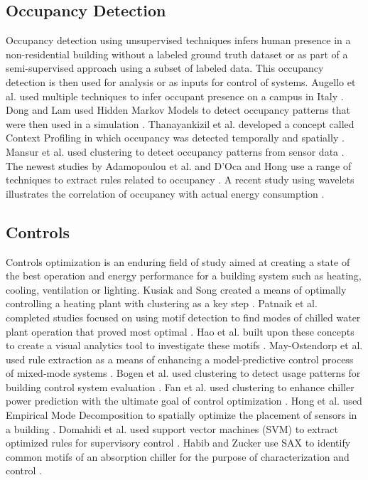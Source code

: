 \documentclass[preprint,12pt,3p]{elsarticle}
\begin{document}
\subsection{Occupancy Detection}
Occupancy detection using unsupervised techniques infers human presence in a non-residential building without a labeled ground truth dataset or as part of a semi-supervised approach using a subset of labeled data. This occupancy detection is then used for analysis or as inputs for control of systems. Augello et al. used multiple techniques to infer occupant presence on a campus in Italy \cite{augello_sensor_2011}. Dong and Lam  used Hidden Markov Models to detect occupancy patterns that were then used in a simulation \cite{dong_building_2011}. Thanayankizil et al. developed a concept called Context Profiling in which occupancy was detected temporally and spatially \cite{thanayankizil_softgreen:_2012}. Mansur et al. used clustering to detect occupancy patterns from sensor data \cite{mansur_learning_2015}. The newest studies by Adamopoulou et al. and D'Oca and Hong use a range of techniques to extract rules related to occupancy \cite{adamopoulou_context-aware_2015,doca_occupancy_2015}. A recent study using wavelets illustrates the correlation of occupancy with actual energy consumption \cite{ahn_correlation_2016}.

\subsection{Controls}
Controls optimization is an enduring field of study aimed at creating a state of the best operation and energy performance for a building system such as heating, cooling, ventilation or lighting. Kusiak and Song created a means of optimally controlling a heating plant with clustering as a key step \cite{kusiak_clustering-based_2008}. Patnaik et al. completed studies focused on using motif detection to find modes of chilled water plant operation that proved most optimal \cite{patnaik_data_2010,patnaik_sustainable_2009}. Hao et al. built upon these concepts to create a visual analytics tool to investigate these motifs \cite{hao_visualizing_2011}. May-Ostendorp et al. used rule extraction as a means of enhancing a model-predictive control process of mixed-mode systems \cite{may-ostendorp_model-predictive_2011,may-ostendorp_extraction_2013}. Bogen et al. used clustering to detect usage patterns for building control system evaluation \cite{bogen_evaluating_2013}. Fan et al. used clustering to enhance chiller power prediction with the ultimate goal of control optimization \cite{fan_prediction_2013}. Hong et al. used Empirical Mode Decomposition to spatially optimize the placement of sensors in a building \cite{hong_towards_2013}. Domahidi et al. used support vector machines (SVM) to extract optimized rules for supervisory control \cite{domahidi_learning_2014}. Habib and Zucker use SAX to identify common motifs of an absorption chiller for the purpose of characterization and control \cite{habib_finding_2015}.
\end{document}
